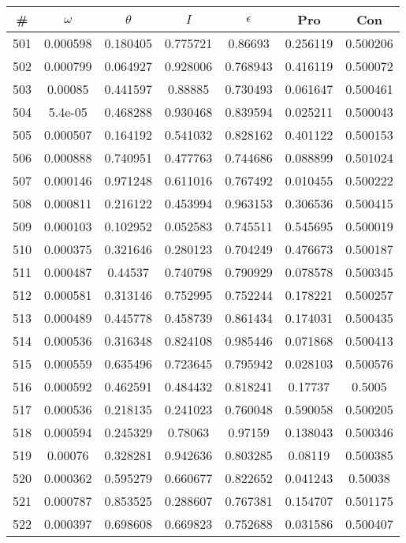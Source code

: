 \newpage
\begin{table}
\begin{tabular}{c|c|c|c|c|c|c}
\# & $\omega$ & $\theta$ & $I$ & $\epsilon$ & Pro & Con\\
\hline
501 & 0.000598 & 0.180405 & 0.775721 & 0.86693 & 0.256119 & 0.500206\\
502 & 0.000799 & 0.064927 & 0.928006 & 0.768943 & 0.416119 & 0.500072\\
503 & 0.00085 & 0.441597 & 0.88885 & 0.730493 & 0.061647 & 0.500461\\
504 & 5.4e-05 & 0.468288 & 0.930468 & 0.839594 & 0.025211 & 0.500043\\
505 & 0.000507 & 0.164192 & 0.541032 & 0.828162 & 0.401122 & 0.500153\\
506 & 0.000888 & 0.740951 & 0.477763 & 0.744686 & 0.088899 & 0.501024\\
507 & 0.000146 & 0.971248 & 0.611016 & 0.767492 & 0.010455 & 0.500222\\
508 & 0.000811 & 0.216122 & 0.453994 & 0.963153 & 0.306536 & 0.500415\\
509 & 0.000103 & 0.102952 & 0.052583 & 0.745511 & 0.545695 & 0.500019\\
510 & 0.000375 & 0.321646 & 0.280123 & 0.704249 & 0.476673 & 0.500187\\
511 & 0.000487 & 0.44537 & 0.740798 & 0.790929 & 0.078578 & 0.500345\\
512 & 0.000581 & 0.313146 & 0.752995 & 0.752244 & 0.178221 & 0.500257\\
513 & 0.000489 & 0.445778 & 0.458739 & 0.861434 & 0.174031 & 0.500435\\
514 & 0.000536 & 0.316348 & 0.824108 & 0.985446 & 0.071868 & 0.500413\\
515 & 0.000559 & 0.635496 & 0.723645 & 0.795942 & 0.028103 & 0.500576\\
516 & 0.000592 & 0.462591 & 0.484432 & 0.818241 & 0.17737 & 0.5005\\
517 & 0.000536 & 0.218135 & 0.241023 & 0.760048 & 0.590058 & 0.500205\\
518 & 0.000594 & 0.245329 & 0.78063 & 0.97159 & 0.138043 & 0.500346\\
519 & 0.00076 & 0.328281 & 0.942636 & 0.803285 & 0.08119 & 0.500385\\
520 & 0.000362 & 0.595279 & 0.660677 & 0.822652 & 0.041243 & 0.50038\\
521 & 0.000787 & 0.853525 & 0.288607 & 0.767381 & 0.154707 & 0.501175\\
522 & 0.000397 & 0.698608 & 0.669823 & 0.752688 & 0.031586 & 0.500407\\

\end{tabular}
\end{table}
